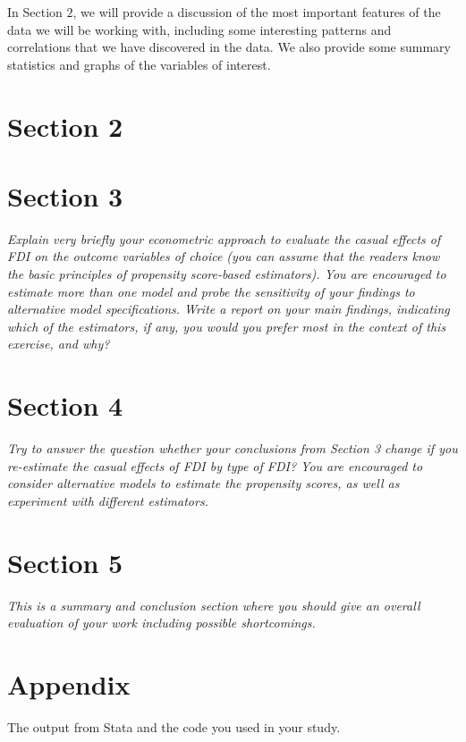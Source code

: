 \documentclass[11pt,a4paper,leqno]{article}
\begin{document}
In Section $2$, we will provide a discussion of the most important features of the data we will be working with, including some interesting patterns and correlations that we have discovered in the data. We also provide some summary statistics and graphs of the variables of interest.

\section*{Section 2}


\section*{Section 3}
\textit{Explain very briefly your econometric approach to evaluate the casual effects of FDI on the outcome variables of choice (you can assume that the readers know the basic principles of propensity score-based estimators). You are encouraged to estimate more than one model and probe the sensitivity of your findings to alternative model specifications. Write a report on your main findings, indicating which of the estimators, if any, you would you prefer most in the context of this exercise, and why?}

\section*{Section 4}
\textit{Try to answer the question whether your conclusions from Section 3 change if you re-estimate the casual effects of FDI by type of FDI? You are encouraged to consider alternative models to estimate the propensity scores, as well as experiment with different estimators.}

\section*{Section 5} 
\textit{This is a summary and conclusion section where you should give an overall evaluation of your work including possible shortcomings.}

\nocite{chen2011}
\clearpage



\appendix
\section*{Appendix}
The output from Stata and the code you used in your study.
\end{document}
